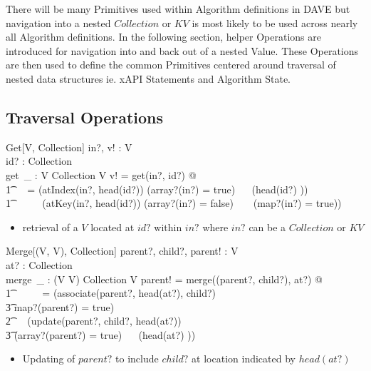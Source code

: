 \documentclass[../main.tex]{subfiles}
\begin{document}
There will be many Primitives used within Algorithm definitions in DAVE but
navigation into a nested $Collection$ or $KV$ is most likely to be used
across nearly all Algorithm definitions. In the following section,
helper Operations are introduced for navigation into and back out of a
nested Value. These Operations are then used to define the common Primitives centered around
traversal of nested data structures ie. xAPI Statements and Algorithm State.

\subsection{Traversal Operations}
\begin{schema}{Get[V, Collection]}
  in?, v! : V \\
  id? : Collection \\
  get~\_ : V \cross Collection \surj V
  \where
  v! = get(in?, id?) @\\
  \t1 \ ~  = (atIndex(in?, head(id?)) \iff (array?(in?) = true) ~\land~ (head(id?) \in \nat)) ~\lor \\
  \t1 \ \ \ \ ~ (atKey(in?, head(id?)) \iff (array?(in?) = false) ~ \land ~ (map?(in?) = true))
\end{schema}
\begin{itemize}
  \item retrieval of a $V$ located at $id?$ within $in?$ where $in?$ can be a $Collection$ or $KV$
\end{itemize}
\begin{schema}{Merge[(V, V), Collection]}
  parent?, child?, parent! : V \\
  at? : Collection \\
  merge~\_ : (V \cross V) \cross Collection \bij V
  \where
  parent! = merge((parent?, child?), at?) @ \\
  \t1 \ \ \ \ ~ = (associate(parent?, head(at?), child?) \\
  \t3 \iff map?(parent?) = true) ~ \lor \\
  \t2 \ ~ (update(parent?, child?, head(at?)) \\
  \t3 \iff (array?(parent?) = true) ~\land~ (head(at?) \in \nat))
\end{schema}
\begin{itemize}
  \item Updating of $parent?$ to include $child?$ at location indicated by $head(at?)$
\end{itemize}
\end{document}

